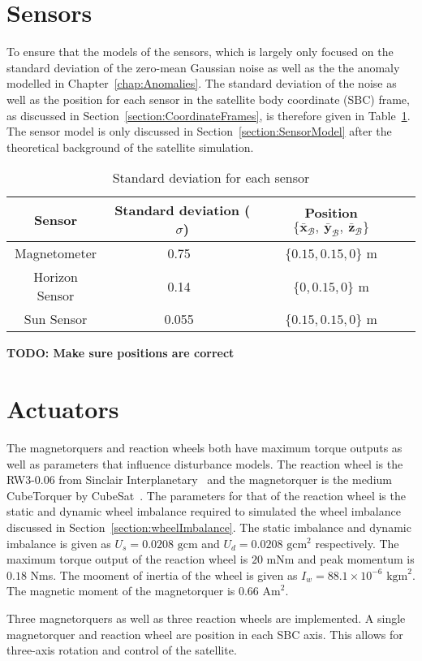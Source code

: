 \section{Sensors}
\label{section:SensorParameters}
To ensure that the models of the sensors, which is largely only focused on the standard deviation of the zero-mean Gaussian noise as well as the the anomaly modelled in Chapter~\ref{chap:Anomalies}. The standard deviation of the noise as well as the position for each sensor in the satellite body coordinate (SBC) frame, as discussed in Section~\ref{section:CoordinateFrames}, is therefore given in Table~\ref{Table:SensorNoise}. The sensor model is only discussed in Section~\ref{section:SensorModel} after the theoretical background of the satellite simulation.
\begin{table}[h!t!b]
	\centering
	\caption{\label{Table:SensorNoise}Standard deviation for each sensor}
	\begin{tabular}{c c c c}
		\hline\hline
		\textbf{Sensor} & Standard deviation ($\sigma$) & Position $\{\bar{\mathbf{x}}_{\mathcal{B}},~\bar{\mathbf{y}}_{\mathcal{B}},~\bar{\mathbf{z}}_{\mathcal{B}}\}$ \\ \hline
		Magnetometer & 0.75~\cite{MagnetometerAAC} & $\{0.15, 0.15, 0\}$ m\\
		Horizon Sensor & 0.14~\cite{wessels2018infrared} & $\{0, 0.15, 0\}$ m\\
		Sun Sensor & 0.055~\cite{SputnixSunSensor} & $\{0.15, 0.15, 0\}$ m\\
		\hline\hline
	\end{tabular}
\end{table}
\textbf{TODO: Make sure positions are correct}

\section{Actuators}
The magnetorquers and reaction wheels both have maximum torque outputs as well as parameters that influence disturbance models. The reaction wheel is the RW3-0.06 from Sinclair Interplanetary~\cite{reactionWheelSinclair} and the magnetorquer is the medium CubeTorquer by CubeSat~\cite{magnetorquerCubeSpace}. The parameters for that of the reaction wheel is the static and dynamic wheel imbalance required to simulated the wheel imbalance discussed in Section~\ref{section:wheelImbalance}. The static imbalance and dynamic imbalance is given as $U_s = 0.0208\text{ gcm}$ and $U_d = 0.0208\text{ gcm}^2$ respectively. The maximum torque output of the reaction wheel is $\num{20}$ mNm and peak momentum is $\num{0.18}$ Nms. The mooment of inertia of the wheel is given as $I_w = 88.1 \times 10^{-6} \text{ kgm}^2$. The magnetic moment of the magnetorquer is $\num{0.66}\text{ Am}^2$.

Three magnetorquers as well as three reaction wheels are implemented. A single magnetorquer and reaction wheel are position in each SBC axis. This allows for three-axis rotation and control of the satellite.